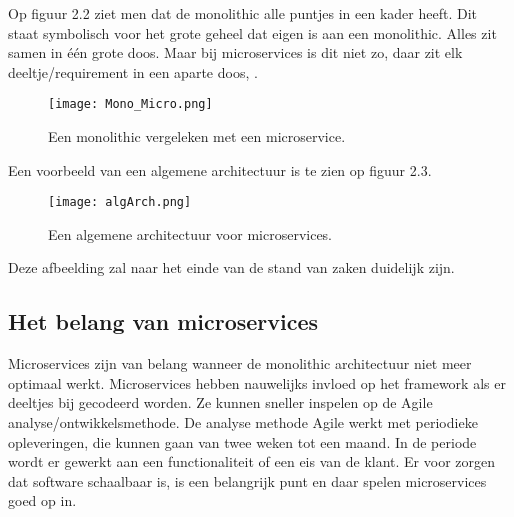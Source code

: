  Op figuur 2.2 ziet men dat de monolithic alle puntjes in een kader heeft. Dit staat symbolisch voor het grote geheel dat eigen is aan een monolithic. Alles zit samen in één grote doos. Maar bij microservices is dit niet zo, daar zit elk deeltje/requirement in een aparte doos, \textcite{Benetis2016a} . 
\begin{figure}[h]
	\texttt{[image: Mono\_Micro.png]}
	\centering
	\caption{Een monolithic vergeleken met een microservice. \textcite{Benetis2016a}}
\end{figure}


Een voorbeeld van een algemene architectuur is te zien op figuur 2.3.
\begin{figure}[h]
	\texttt{[image: algArch.png]}
	\centering
	\caption{Een algemene architectuur voor microservices. \textcite{Koukia2018}}
\end{figure}
Deze afbeelding zal naar het einde van de stand van zaken duidelijk zijn.


\subsection{Het belang van microservices}
Microservices zijn van belang wanneer de monolithic architectuur niet meer optimaal werkt. Microservices hebben nauwelijks invloed op het framework als er deeltjes bij gecodeerd worden. Ze kunnen sneller inspelen op de Agile analyse/ontwikkelsmethode. De analyse methode Agile werkt met periodieke opleveringen, die kunnen gaan van twee weken tot een maand. In de periode wordt er gewerkt aan een functionaliteit of een eis van de klant. 
Er voor zorgen dat software schaalbaar is, is een belangrijk punt en daar spelen microservices goed op in.


